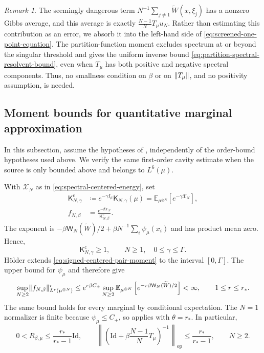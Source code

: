 \documentclass[11pt,reqno]{amsart}
\numberwithin{equation}{section}
\theoremstyle{plain}
\theoremstyle{remark}
\newtheorem{remark}[remark]{Remark}
\DeclarePairedDelimiter{\norm}{\lVert}{\rVert}
\newcommand{\E}{{\mathbb{E}}}
\newcommand{\K}{{\mathsf{K}}}
\newcommand{\tl}{\widetilde}
\newcommand{\be}{\beta}
\newcommand{\Tc}{T_\mu}
\begin{document}
\begin{remark}
The seemingly dangerous term \(N^{-1}\sum_{j\ne1}\tl W(x,\xi_j)\) has a nonzero Gibbs average, and this average is exactly \(\frac{N-1}{N}\Tc u_N\).  Rather than estimating this contribution as an error, we absorb it into the left-hand side of \eqref{eq:screened-one-point-equation}.  The partition-function moment excludes spectrum at or beyond the singular threshold and gives the uniform inverse bound \eqref{eq:partition-spectral-resolvent-bound}, even when \(\Tc\) has both positive and negative spectral components.  Thus, no smallness condition on \(\be\) or on \(\norm{\Tc}\), and no positivity assumption, is needed.
\end{remark}

\subsection{Moment bounds for quantitative marginal approximation}
\label{subsec:signed-first-cavity-estimate}

In this subsection, assume the hypotheses of
, independently of the order-bound
hypotheses used above.  We verify the same first-order cavity estimate
when the source is only bounded above and belongs to $L^6(\mu)$.

With $\mathcal X_N$ as in \eqref{eq:spectral-centered-energy}, set
\begin{align}
 \K^{\mathrm c}_{N,\gamma}
 &\coloneqq e^{-\gamma I_\mu}\K_{N,\gamma}(\mu)
 =\E_{\mu^{\otimes N}}\left[e^{-\gamma\mathcal X_N}\right],
 \label{eq:exact-centered-partition}\\
 f_{N,\be}&=\frac{e^{-\be\mathcal X_N}}{\K^{\mathrm c}_{N,\be}}.
 \label{eq:exact-centered-density}
\end{align}
The exponent is $-\be\mathsf W_N(\tl W)/2+
\be N^{-1}\sum_i\psi_\mu(x_i)$ and has product mean zero.  Hence,
\begin{equation}\label{eq:exact-Z-lower}
 \K^{\mathrm c}_{N,\gamma}\geq1,\qquad N\geq1,\quad 0\leq\gamma\leq\Gamma.
\end{equation}
H\"older extends \eqref{eq:signed-centered-pair-moment} to the interval
$[0,\Gamma]$.  The upper bound for $\psi_\mu$ and
 therefore give
\begin{equation}\label{eq:exact-full-density-Lr}
 \sup_{N\geq2}\norm{f_{N,\be}}_{L^r(\mu^{\otimes N})}^r
 \leq e^{r\be C_+}\sup_{N\geq2}
     \E_{\mu^{\otimes N}}\left[e^{-r\be\mathsf W_N(\tl W)/2}\right]
 <\infty,\qquad 1\leq r\leq r_*.
\end{equation}
The same bound holds for every marginal by conditional expectation.  The
$N=1$ normalizer is finite because $\psi_\mu\leq C_+$, so
 applies with $\theta=r_*$.  In
particular,
\begin{equation}\label{eq:signed-resolvent-bound}
 0<R_{\be,\mu}\leq\frac{r_*}{r_*-1}\mathrm{Id},\qquad
 \left\|\left(\mathrm{Id}+\be\frac{N-1}{N}T_\mu\right)^{-1}\right\|_{\mathrm{op}}
 \leq\frac{r_*}{r_*-1},\qquad N\geq2.
\end{equation}
\end{document}
